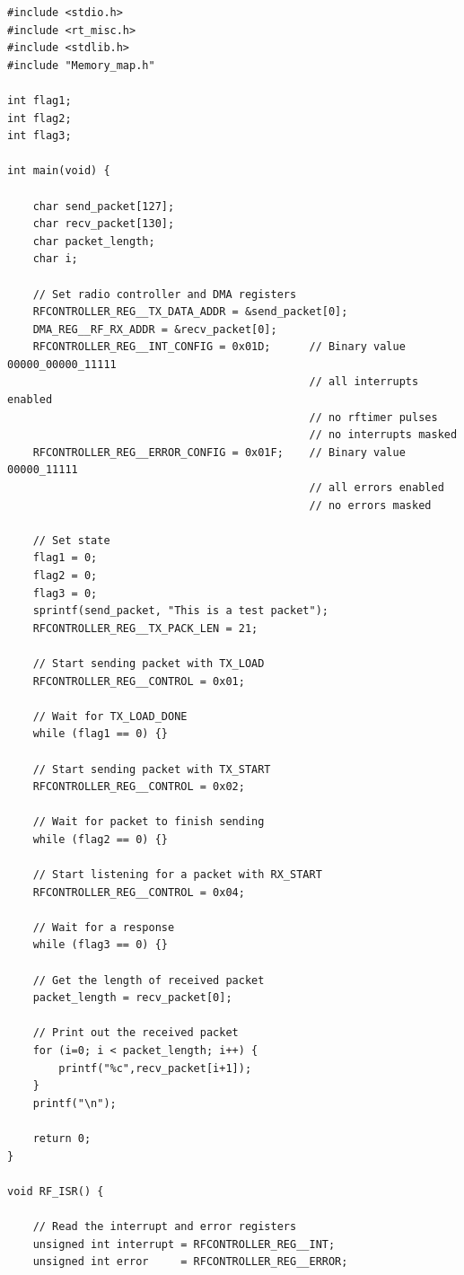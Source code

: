 \begin{lstlisting}
#include <stdio.h>
#include <rt_misc.h>
#include <stdlib.h>
#include "Memory_map.h"

int flag1;
int flag2;
int flag3;

int main(void) {

    char send_packet[127];
    char recv_packet[130];
    char packet_length;
    char i;

    // Set radio controller and DMA registers
    RFCONTROLLER_REG__TX_DATA_ADDR = &send_packet[0];
    DMA_REG__RF_RX_ADDR = &recv_packet[0];
    RFCONTROLLER_REG__INT_CONFIG = 0x01D;      // Binary value 00000_00000_11111
                                               // all interrupts enabled
                                               // no rftimer pulses
                                               // no interrupts masked
    RFCONTROLLER_REG__ERROR_CONFIG = 0x01F;    // Binary value 00000_11111
                                               // all errors enabled
                                               // no errors masked
    
    // Set state
    flag1 = 0;
    flag2 = 0;
    flag3 = 0;
    sprintf(send_packet, "This is a test packet");
    RFCONTROLLER_REG__TX_PACK_LEN = 21;
    
    // Start sending packet with TX_LOAD
    RFCONTROLLER_REG__CONTROL = 0x01;
    
    // Wait for TX_LOAD_DONE
    while (flag1 == 0) {}
    
    // Start sending packet with TX_START
    RFCONTROLLER_REG__CONTROL = 0x02;
    
    // Wait for packet to finish sending
    while (flag2 == 0) {}
    
    // Start listening for a packet with RX_START
    RFCONTROLLER_REG__CONTROL = 0x04;
    
    // Wait for a response
    while (flag3 == 0) {}

    // Get the length of received packet
    packet_length = recv_packet[0];

    // Print out the received packet
    for (i=0; i < packet_length; i++) {
        printf("%c",recv_packet[i+1]);
    }
    printf("\n");
    
    return 0;
}

void RF_ISR() {

    // Read the interrupt and error registers
    unsigned int interrupt = RFCONTROLLER_REG__INT;
    unsigned int error     = RFCONTROLLER_REG__ERROR;


\end{lstlisting}
